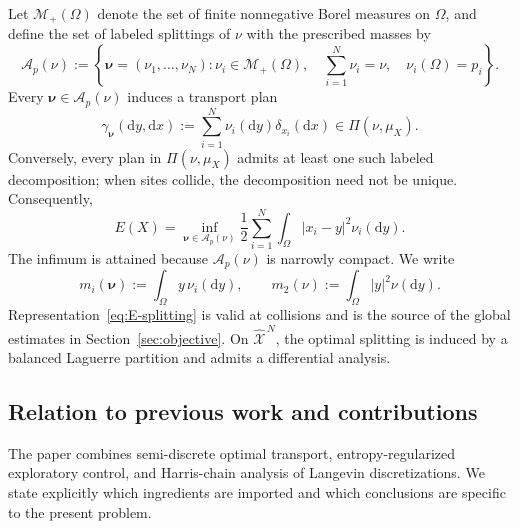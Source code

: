 \documentclass[11pt]{article}
\def\Ac{{\mathcal A}}
\def\Xc{{\mathcal X}}
\def\hX{\widehat{\Xc}^{\,N}}
\newcommand{\dd}{\mathrm{d}}
\theoremstyle{definition}
\theoremstyle{remark}
\numberwithin{equation}{section}
\begin{document}
Let $\mathcal M_+(\Omega)$ denote the set of finite nonnegative Borel measures on $\Omega$, and
define the set of labeled splittings of $\nu$ with the prescribed masses by
\begin{equation}\label{eq:splittings}
 \Ac_p(\nu):=
 \left\{
 \boldsymbol\nu=(\nu_1,\ldots,\nu_N):
 \nu_i\in\mathcal M_+(\Omega),\quad
 \sum_{i=1}^N\nu_i=\nu,\quad
 \nu_i(\Omega)=p_i
 \right\}.
\end{equation}
Every $\boldsymbol\nu\in\Ac_p(\nu)$ induces a transport plan
\[
 \gamma_{\boldsymbol\nu}(\dd y,\dd x)
 :=\sum_{i=1}^N\nu_i(\dd y)\delta_{x_i}(\dd x)
 \in\Pi(\nu,\mu_X).
\]
Conversely, every plan in $\Pi(\nu,\mu_X)$ admits at least one such labeled decomposition; when
sites collide, the decomposition need not be unique.  Consequently,
\begin{equation}\label{eq:E-splitting}
 E(X)=\inf_{\boldsymbol\nu\in\Ac_p(\nu)}
 \frac12\sum_{i=1}^N\int_\Omega|x_i-y|^2\nu_i(\dd y).
\end{equation}
The infimum is attained because $\Ac_p(\nu)$ is narrowly compact.  We write
\begin{equation}\label{eq:first-moments-splitting}
 m_i(\boldsymbol\nu):=\int_\Omega y\,\nu_i(\dd y),
 \qquad
 m_2(\nu):=\int_\Omega|y|^2\nu(\dd y).
\end{equation}
Representation~\eqref{eq:E-splitting} is valid at collisions and is the source of the global
estimates in Section~\ref{sec:objective}.  On $\hX$, the optimal splitting is induced by a balanced
Laguerre partition and admits a differential analysis.

\subsection{Relation to previous work and contributions}
\label{subsec:literature-contributions}

The paper combines semi-discrete optimal transport, entropy-regularized
exploratory control, and Harris-chain analysis of Langevin discretizations.  We state explicitly
which ingredients are imported and which conclusions are specific to the present problem.
\end{document}
